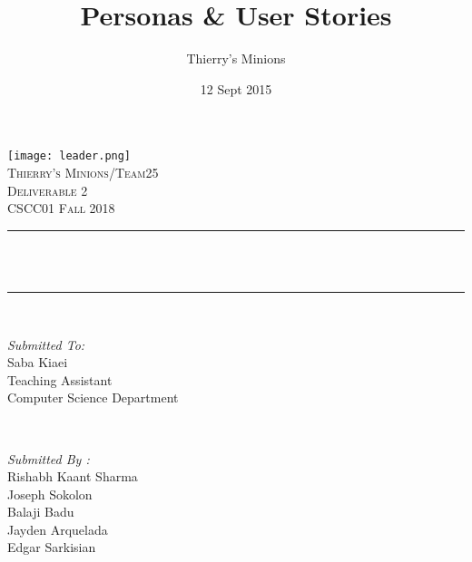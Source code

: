 \documentclass[12pt]{article}
\title{Personas \& User Stories}								%
\author{Thierry's Minions}								%
\date{12 Sept 2015}											%
\makeatletter
\let\thetitle\@title
\makeatother
\begin{document}

\begin{titlepage}
	\centering
    \vspace*{0.5 cm}
    \texttt{[image: leader.png]}\\[1.0 cm]	%
    \textsc{\LARGE Thierry's Minions/Team25\\[0.5em] Deliverable 2}\\[2.0 cm]	
	\textsc{\Large CSCC01 Fall 2018}\\[0.5 cm]				%
	\rule{\linewidth}{0.2 mm} \\[0.4 cm]
	{ \huge \bfseries \thetitle}\\
	\rule{\linewidth}{0.2 mm} \\[1.5 cm]
	
	\begin{minipage}{0.4\textwidth}
		\begin{flushleft} \large
			\emph{Submitted To:}\\
			Saba Kiaei\\
            Teaching Assistant\\
            Computer Science Department\\
			\end{flushleft}
			\end{minipage}~
			\begin{minipage}{0.4\textwidth}
            
			\begin{flushright} \large
			\emph{Submitted By :} \\
			Rishabh Kaant Sharma\\
            Joseph Sokolon\\
            Balaji Badu\\
            Jayden Arquelada\\
            Edgar Sarkisian\\
		\end{flushright}
        
	\end{minipage}\\[2 cm]
	
	
    
    
    
    
	
\end{titlepage}

\end{document}
